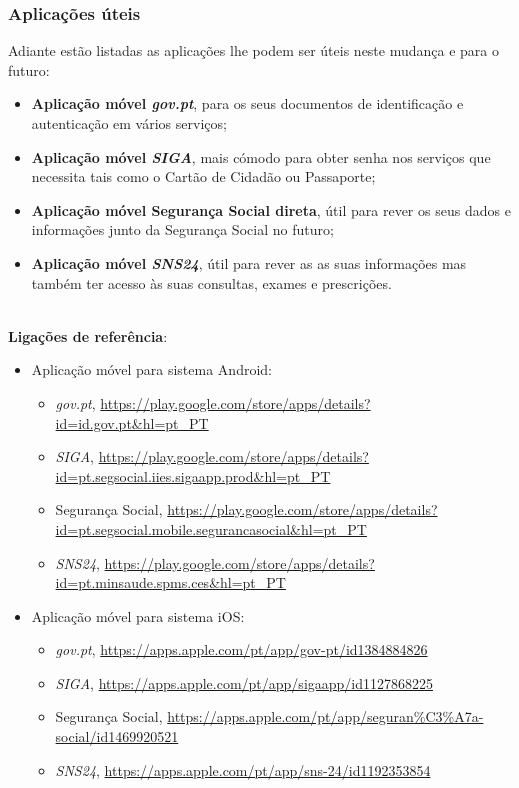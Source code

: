 \newpage

\subsubsection{Aplicações úteis}

Adiante estão listadas as aplicações lhe podem ser úteis neste mudança e
para o futuro:
\begin{itemize}
	\item \textbf{Aplicação móvel \emph{gov.pt}}, para os seus documentos de identificação e autenticação em vários serviços;
	\item \textbf{Aplicação móvel \emph{SIGA}}, mais cómodo para obter senha nos serviços que necessita tais como o Cartão de Cidadão ou Passaporte;
	\item \textbf{Aplicação móvel Segurança Social direta}, útil para rever os seus dados e informações junto da Segurança Social no futuro;
	\item \textbf{Aplicação móvel \emph{SNS24}}, útil para rever as as suas informações mas também ter acesso às suas consultas, exames e prescrições.
\end{itemize}
\leavevmode\\
\textbf{Ligações de referência}:
\begin{itemize}
	\item Aplicação móvel para sistema Android:
	\begin{itemize}
		\item \emph{gov.pt}, \url{https://play.google.com/store/apps/details?id=id.gov.pt\&hl=pt\_PT}
		\item \emph{SIGA}, \url{https://play.google.com/store/apps/details?id=pt.segsocial.iies.sigaapp.prod\&hl=pt\_PT}
		\item Segurança Social, \url{https://play.google.com/store/apps/details?id=pt.segsocial.mobile.segurancasocial\&hl=pt\_PT}
		\item \emph{SNS24}, \url{https://play.google.com/store/apps/details?id=pt.minsaude.spms.ces\&hl=pt\_PT}
	\end{itemize}
	\item Aplicação móvel para sistema iOS:
	\begin{itemize}
		\item \emph{gov.pt}, \url{https://apps.apple.com/pt/app/gov-pt/id1384884826}
		\item \emph{SIGA}, \url{https://apps.apple.com/pt/app/sigaapp/id1127868225}
		\item Segurança Social, \url{https://apps.apple.com/pt/app/seguran\%C3\%A7a-social/id1469920521}
		\item \emph{SNS24}, \url{https://apps.apple.com/pt/app/sns-24/id1192353854}
	\end{itemize}
\end{itemize}

